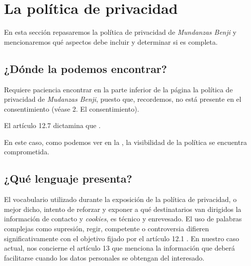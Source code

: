 \section{La política de privacidad}
En esta sección repasaremos la política de privacidad de \textit{Mundanzas Benji} \cite{benjiprivacidad} y mencionaremos qué aspectos debe incluir y determinar si es completa.

\subsection{¿Dónde la podemos encontrar?}
Requiere paciencia encontrar en la parte inferior de la página la política de privacidad de \textit{Mudanzas Benji}, puesto que, recordemos, no está presente en el consentimiento (véase 2. El consentimiento).

El artículo 12.7 dictamina que . 

En este caso, como podemos ver en la , la visibilidad de la política se encuentra comprometida.

\newpage
\subsection{¿Qué lenguaje presenta?}
El vocabulario utilizado durante la exposición de la política de privacidad, o mejor dicho, intento de reforzar y exponer a qué destinatarios van dirigidos la información de contacto y \textit{cookies}, es técnico y enrevesado. El uso de palabras complejas como supresión, regir, competente o controversia difieren significativamente con el objetivo fijado por el artículo 12.1 . En nuestro caso actual, nos concierne el artículo 13 que menciona la información que deberá facilitarse cuando los datos personales se obtengan del interesado.

